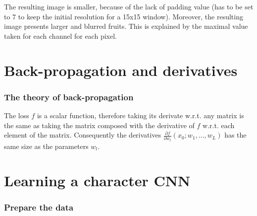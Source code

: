 \documentclass{article}
\begin{document}
The resulting image is smaller, because of the lack of padding value (has to be set to 7 to keep the initial resolution for a 15x15 window). Moreover, the resulting image presents larger and blurred fruits. This is explained by the maximal value taken for each channel for each pixel.


\part{Back-propagation and derivatives}

\section{The theory of back-propagation}


The loss \(f\) is a scalar function, therefore taking its derivate w.r.t. any matrix is the same as taking the matrix composed with the derivative of \(f\) w.r.t. each element of the matrix. Consequently the derivatives \(\frac{\partial f}{\partial w_l}(x_0;w_1,…,w_L)\) has the same size as the parameters \(w_l\).

\part{Learning a character CNN}

\section{Prepare the data}
\end{document}
